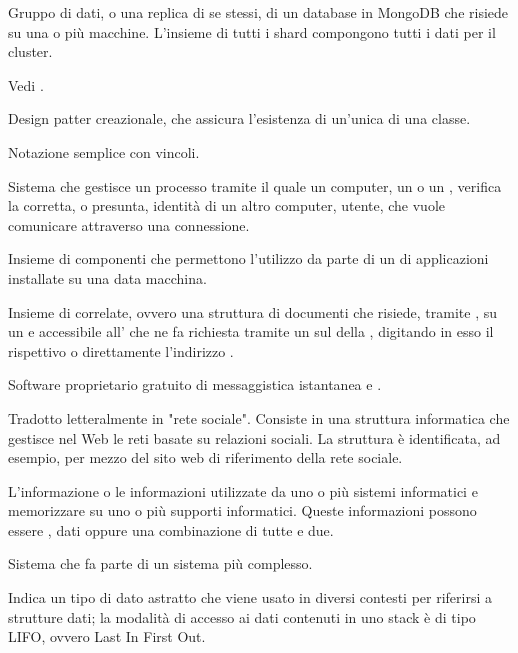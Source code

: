 {Gruppo di dati, o una replica di se stessi, di un database in MongoDB che risiede su una o più macchine. L'insieme di tutti i shard compongono tutti i dati per il cluster.}

{Vedi .}

{Design patter creazionale, che assicura l'esistenza di un'unica di una classe.}

{Notazione semplice con vincoli.}

{Sistema che gestisce un processo tramite il quale un computer, un  o un , verifica la corretta, o presunta, identità di un altro computer, utente, che vuole comunicare attraverso una connessione.}

{Insieme di componenti  che permettono l'utilizzo da parte di un  di applicazioni installate su una data macchina.}

{Insieme di  correlate, ovvero una struttura  di documenti che risiede, tramite , su un   e accessibile all'  che ne fa richiesta tramite un  sul  della  , digitando in esso il rispettivo  o direttamente l'indirizzo .}

{Software proprietario gratuito di messaggistica istantanea e .}

{Tradotto letteralmente in "rete sociale". Consiste in una struttura informatica che gestisce nel Web le reti basate su relazioni sociali. La struttura è identificata, ad esempio, per mezzo del sito web di riferimento della rete sociale.}

{L'informazione o le informazioni utilizzate da uno o più sistemi informatici e memorizzare su uno o più supporti informatici. Queste informazioni possono essere , dati oppure una combinazione di tutte e due.}

{Sistema che fa parte di un sistema più complesso.}

{Indica un tipo di dato astratto che viene usato in diversi contesti per riferirsi a strutture dati; la modalità di accesso ai dati contenuti in uno stack è di tipo LIFO, ovvero Last In First Out.}

